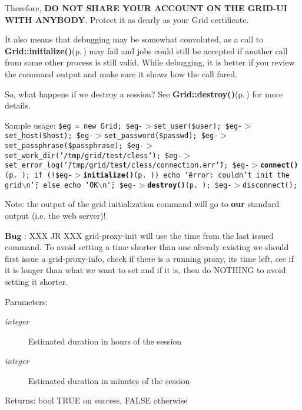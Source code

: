 Therefore, {\bf DO NOT SHARE YOUR ACCOUNT ON THE GRID-UI WITH ANYBODY}. Protect it as dearly as your Grid certificate.

It also means that debugging may be somewhat convoluted, as a call to {\bf Grid::initialize()}{\rm (p.\,\pageref{classGrid_a11})} may fail and jobs could still be accepted if another call from some other process is still valid. While debugging, it is better if you review the command output and make sure it shows how the call fared.

So, what happens if we destroy a session? See {\bf Grid::destroy()}{\rm (p.\,\pageref{classGrid_a12})} for more details.

Sample usage: {\tt  \$eg = new Grid; \$eg-$>$set\_\-user(\$user); \$eg-$>$set\_\-host(\$host); \$eg-$>$set\_\-password(\$passwd); \$eg-$>$set\_\-passphrase(\$passphrase); \$eg-$>$set\_\-work\_\-dir(\char`\"{}/tmp/grid/test/cless\char`\"{}); \$eg-$>$set\_\-error\_\-log(\char`\"{}/tmp/grid/test/cless/connection.err\char`\"{}); \$eg-$>${\bf connect()}{\rm (p.\,\pageref{classGrid_a10})}; if (!\$eg-$>${\bf initialize()}{\rm (p.\,\pageref{classGrid_a11})}) echo \char`\"{}error: couldn't init the grid$\backslash$n\char`\"{}; else echo \char`\"{}OK$\backslash$n\char`\"{}; \$eg-$>${\bf destroy()}{\rm (p.\,\pageref{classGrid_a12})}; \$eg-$>$disconnect(); }

\begin{Desc}
\item[Note:]the output of the grid initialization command will go to {\bf our} standard output (i.e. the web server)!\end{Desc}


\begin{Desc}
\item[{\bf Bug}]: XXX JR XXX grid-proxy-init will use the time from the last issued command. To avoid setting a time shorter than one already existing we should first issue a grid-proxy-info, check if there is a running proxy, its time left, see if it is longer than what we want to set and if it is, then do NOTHING to avoid setting it shorter. \end{Desc}
\begin{Desc}
\item[Parameters:]
\begin{description}
\item[{\em integer}]Estimated duration in hours of the session\item[{\em integer}]Estimated duration in minutes of the session\end{description}
\end{Desc}
\begin{Desc}
\item[Returns:]bool TRUE on success, FALSE otherwise \end{Desc}


